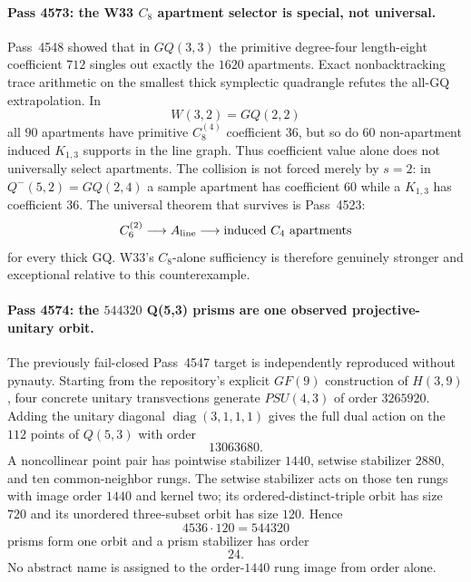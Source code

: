 \paragraph{Pass 4573: the W33 $C_8$ apartment selector is special, not universal.}
Pass~4548 showed that in $GQ(3,3)$ the primitive degree-four length-eight coefficient $712$ singles out exactly the $1620$ apartments.  Exact nonbacktracking trace arithmetic on the smallest thick symplectic quadrangle refutes the all-GQ extrapolation.  In
\[
 W(3,2)=GQ(2,2)
\]
all $90$ apartments have primitive $C_8^{(4)}$ coefficient $36$, but so do $60$ non-apartment induced $K_{1,3}$ supports in the line graph.  Thus coefficient value alone does not universally select apartments.  The collision is not forced merely by $s=2$: in
$Q^-(5,2)=GQ(2,4)$ a sample apartment has coefficient $60$ while a $K_{1,3}$ has coefficient $36$.  The universal theorem that survives is Pass~4523:
\[
 C_6^{(2)}\longrightarrow A_{\rm line}\longrightarrow\text{induced }C_4\text{ apartments}
\]
for every thick GQ.  W33's $C_8$-alone sufficiency is therefore genuinely stronger and exceptional relative to this counterexample.

\paragraph{Pass 4574: the $544320$ Q(5,3) prisms are one observed projective-unitary orbit.}
The previously fail-closed Pass~4547 target is independently reproduced without pynauty.  Starting from the repository's explicit $GF(9)$ construction of $H(3,9)$, four concrete unitary transvections generate $PSU(4,3)$ of order $3265920$.  Adding the unitary diagonal $\operatorname{diag}(3,1,1,1)$ gives the full dual action on the $112$ points of $Q(5,3)$ with order
\[
 \boxed{13063680.}
\]
A noncollinear point pair has pointwise stabilizer $1440$, setwise stabilizer $2880$, and ten common-neighbor rungs.  The setwise stabilizer acts on those ten rungs with image order $1440$ and kernel two; its ordered-distinct-triple orbit has size $720$ and its unordered three-subset orbit has size $120$.  Hence
\[
 \boxed{4536\cdot120=544320}
\]
prisms form one orbit and a prism stabilizer has order
\[
 \boxed{24.}
\]
No abstract name is assigned to the order-$1440$ rung image from order alone.

